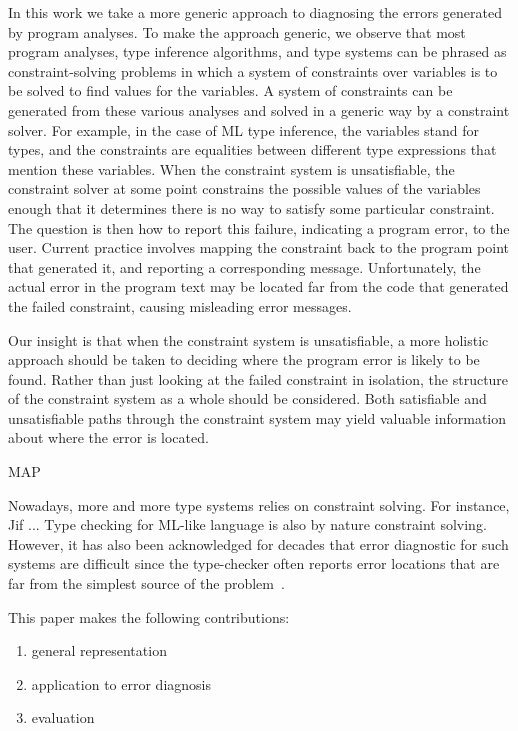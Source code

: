 In this work we take a more generic approach to diagnosing the errors
generated by program analyses.  To make the approach generic, we
observe that most program analyses, type inference algorithms, and
type systems can be phrased as constraint-solving problems in which a
system of constraints over variables is to be solved to find values
for the variables.  A system of constraints can be generated from
these various analyses and solved in a generic way by a constraint
solver. For example, in the case of ML type inference, the variables
stand for types, and the constraints are equalities between different
type expressions that mention these variables. When the constraint
system is unsatisfiable, the constraint solver at some point
constrains the possible values of the variables enough that it
determines there is no way to satisfy some particular constraint. The
question is then how to report this failure, indicating a program
error, to the user. Current practice involves mapping the constraint
back to the program point that generated it, and reporting a
corresponding message. Unfortunately, the actual error in the program
text may be located far from the code that generated the failed
constraint, causing misleading error messages.

Our insight is that when the constraint system is unsatisfiable, a
more holistic approach should be taken to deciding where the program
error is likely to be found. Rather than just looking at the failed
constraint in isolation, the structure of the constraint system as
a whole should be considered. Both satisfiable and unsatisfiable
paths through the constraint system may yield valuable information
about where the error is located.

MAP

Nowadays, more and more type systems relies on constraint solving. For
instance, Jif ... Type checking for ML-like language is also by nature
constraint solving. However, it has also been acknowledged for
decades that error diagnostic for such systems are difficult
since the type-checker often reports error locations that are far from the
simplest source of the problem~\cite{wand-errorfinding}.


This paper makes the following contributions:

\begin{enumerate}
\item
general representation

\item
application to error diagnosis

\item
evaluation
\end{enumerate}

